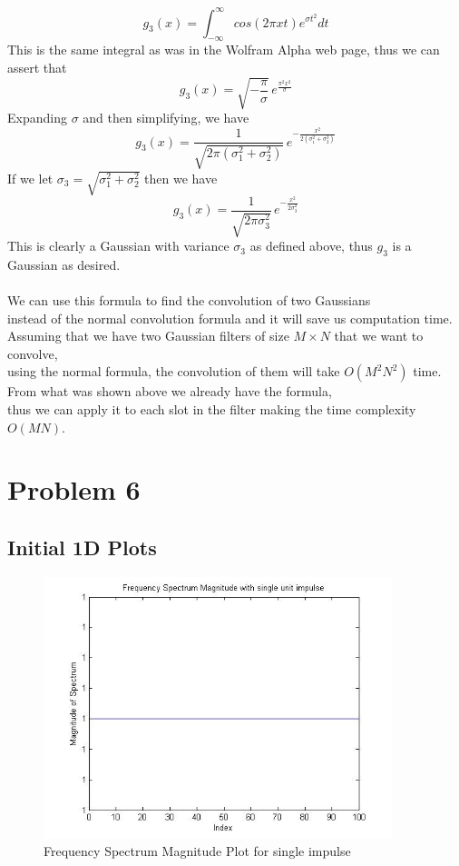 \documentclass[11pt,psfig]{article}
\begin{document}
\[
g_3(x) = \int_{-\infty}^{\infty} cos(2 \pi x t)e^{\sigma t^2} dt
\]
This is the same integral as was in the Wolfram Alpha web page, thus we can assert that
\[
g_3(x) = \sqrt{-\frac{\pi}{\sigma}} \, e^{\frac{\pi^2 x^2}{\sigma}}
\]
Expanding $\sigma$ and then simplifying, we have
\[
g_3(x) = \frac{1}{\sqrt{2\pi (\sigma_1^2 + \sigma_2^2)}} \, e^{-\frac{x^2}{2(\sigma_1^2 + \sigma_2^2)}}
\]
If we let $\sigma_3 = \sqrt{\sigma_1^2 + \sigma_2^2}$ then we have
\[
g_3(x) = \frac{1}{\sqrt{2\pi \sigma_3^2}} \, e^{-\frac{x^2}{2\sigma_3^2}}
\]
This is clearly a Gaussian with variance $\sigma_3$ as defined above, thus $g_3$ is a Gaussian as desired.\\
\\
We can use this formula to find the convolution of two Gaussians \\
instead of the normal convolution formula and it will save us computation time. \\
Assuming that we have two Gaussian filters of size $M \times N$ that we want to convolve, \\
using the normal formula, the convolution of them will take $O(M^2 N^2)$ time. \\
From what was shown above we already have the formula, \\
thus we can apply it to each slot in the filter making the time complexity $O(MN)$. \\

\newpage

\section*{Problem 6}

\subsection*{Initial 1D Plots}

\begin{figure}[H]
\centering
\includegraphics[height=3in]{prob6plot_freq1.jpg}
\caption{Frequency Spectrum Magnitude Plot for single impulse}
\end{figure}
\end{document}
